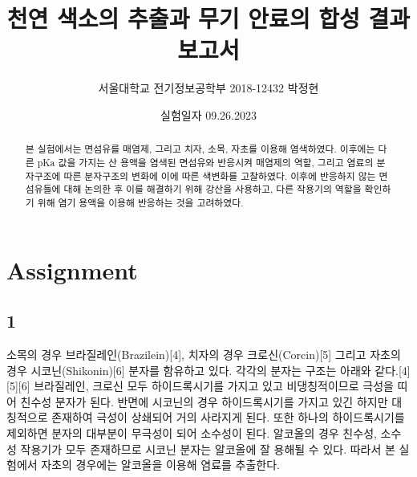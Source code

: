 \documentclass[%
 reprint,
 amsmath,amssymb,
 aps,
]{revtex4-2}
\begin{document}
\title{천연 색소의 추출과 무기 안료의 합성 결과보고서}

\author{서울대학교 전기정보공학부 2018-12432 박정현}
\date{실험일자 09.26.2023}%

\begin{abstract}
본 실험에서는 면섬유를 매염제, 그리고 치자, 소목, 자초를 이용해 염색하였다. 이후에는 다른 pKa 값을 가지는 산 용액을 염색된 면섬유와 반응시켜 매염제의 역할, 그리고 염료의 분자구조에 따른 분자구조의 변화에 이에 따른 색변화를 고찰하였다. 이후에 반응하지 않는 면섬유들에 대해 논의한 후 이를 해결하기 위해 강산을 사용하고, 다른 작용기의 역할을 확인하기 위해 염기 용액을 이용해 반응하는 것을 고려하였다.
\end{abstract}

\maketitle


\section{\label{sec:level1}Assignment}
\subsection{\label{sec:level2}1}
소목의 경우 브라질레인(Brazilein)[4], 치자의 경우 크로신(Corcin)[5] 그리고 자초의 경우 시코닌(Shikonin)[6] 분자를 함유하고 있다. 각각의 분자는 구조는 아래와 같다.[4][5][6] 브라질레인, 크로신 모두 하이드록시기를 가지고 있고 비댕칭적이므로 극성을 띠어 친수성 분자가 된다. 반면에 시코닌의 경우 하이드록시기를 가지고 있긴 하지만 대칭적으로 존재하여 극성이 상쇄되어 거의 사라지게 된다. 또한 하나의 하이드록시기를 제외하면 분자의 대부분이 무극성이 되어 소수성이 된다. 알코올의 경우 친수성, 소수성 작용기가 모두 존재하므로 시코닌 분자는 알코올에 잘 용해될 수 있다. 따라서 본 실험에서 자초의 경우에는 알코올을 이용해 염료를 추출한다.\\
\end{document}
